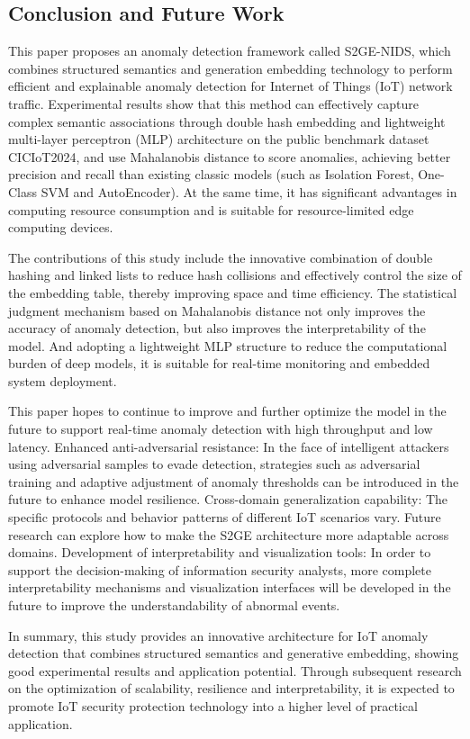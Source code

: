 \begin{ZhChapter}

    \chapter{Conclusion and Future Work}
    This paper proposes an anomaly detection framework called S2GE-NIDS, which combines structured semantics and generation embedding technology to perform efficient and explainable anomaly detection for Internet of Things (IoT) network traffic. Experimental results show that this method can effectively capture complex semantic associations through double hash embedding and lightweight multi-layer perceptron (MLP) architecture on the public benchmark dataset CICIoT2024, and use Mahalanobis distance to score anomalies, achieving better precision and recall than existing classic models (such as Isolation Forest, One-Class SVM and AutoEncoder). At the same time, it has significant advantages in computing resource consumption and is suitable for resource-limited edge computing devices.

    The contributions of this study include the innovative combination of double hashing and linked lists to reduce hash collisions and effectively control the size of the embedding table, thereby improving space and time efficiency. The statistical judgment mechanism based on Mahalanobis distance not only improves the accuracy of anomaly detection, but also improves the interpretability of the model. And adopting a lightweight MLP structure to reduce the computational burden of deep models, it is suitable for real-time monitoring and embedded system deployment.

    This paper hopes to continue to improve and further optimize the model in the future to support real-time anomaly detection with high throughput and low latency. Enhanced anti-adversarial resistance: In the face of intelligent attackers using adversarial samples to evade detection, strategies such as adversarial training and adaptive adjustment of anomaly thresholds can be introduced in the future to enhance model resilience. Cross-domain generalization capability: The specific protocols and behavior patterns of different IoT scenarios vary. Future research can explore how to make the S2GE architecture more adaptable across domains. Development of interpretability and visualization tools: In order to support the decision-making of information security analysts, more complete interpretability mechanisms and visualization interfaces will be developed in the future to improve the understandability of abnormal events.

    In summary, this study provides an innovative architecture for IoT anomaly detection that combines structured semantics and generative embedding, showing good experimental results and application potential. Through subsequent research on the optimization of scalability, resilience and interpretability, it is expected to promote IoT security protection technology into a higher level of practical application.

\end{ZhChapter}